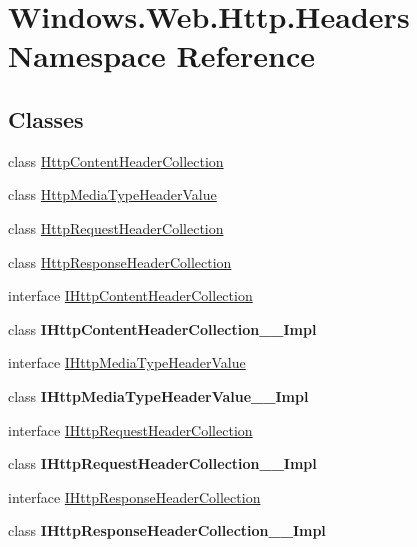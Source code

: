 \hypertarget{namespace_windows_1_1_web_1_1_http_1_1_headers}{}\section{Windows.\+Web.\+Http.\+Headers Namespace Reference}
\label{namespace_windows_1_1_web_1_1_http_1_1_headers}
\subsection*{Classes}
\begin{DoxyCompactItemize}
\item 
class \hyperlink{class_windows_1_1_web_1_1_http_1_1_headers_1_1_http_content_header_collection}{Http\+Content\+Header\+Collection}
\item 
class \hyperlink{class_windows_1_1_web_1_1_http_1_1_headers_1_1_http_media_type_header_value}{Http\+Media\+Type\+Header\+Value}
\item 
class \hyperlink{class_windows_1_1_web_1_1_http_1_1_headers_1_1_http_request_header_collection}{Http\+Request\+Header\+Collection}
\item 
class \hyperlink{class_windows_1_1_web_1_1_http_1_1_headers_1_1_http_response_header_collection}{Http\+Response\+Header\+Collection}
\item 
interface \hyperlink{interface_windows_1_1_web_1_1_http_1_1_headers_1_1_i_http_content_header_collection}{I\+Http\+Content\+Header\+Collection}
\item 
class {\bfseries I\+Http\+Content\+Header\+Collection\+\_\+\+\_\+\+Impl}
\item 
interface \hyperlink{interface_windows_1_1_web_1_1_http_1_1_headers_1_1_i_http_media_type_header_value}{I\+Http\+Media\+Type\+Header\+Value}
\item 
class {\bfseries I\+Http\+Media\+Type\+Header\+Value\+\_\+\+\_\+\+Impl}
\item 
interface \hyperlink{interface_windows_1_1_web_1_1_http_1_1_headers_1_1_i_http_request_header_collection}{I\+Http\+Request\+Header\+Collection}
\item 
class {\bfseries I\+Http\+Request\+Header\+Collection\+\_\+\+\_\+\+Impl}
\item 
interface \hyperlink{interface_windows_1_1_web_1_1_http_1_1_headers_1_1_i_http_response_header_collection}{I\+Http\+Response\+Header\+Collection}
\item 
class {\bfseries I\+Http\+Response\+Header\+Collection\+\_\+\+\_\+\+Impl}
\end{DoxyCompactItemize}

